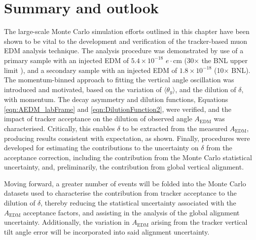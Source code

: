 \section{Summary and outlook}

The large-scale Monte Carlo simulation efforts outlined in this chapter have been shown to be vital to the development and verification of the tracker-based muon EDM analysis technique. The analysis procedure was demonstrated by use of a primary sample with an injected EDM of $5.4\times10^{-18}$ $e\cdot$cm (30$\times$ the BNL upper limit \cite{BNLEDM}), and a secondary sample with an injected EDM of $1.8\times10^{-18}$ (10$\times$ BNL). The momentum-binned approach to fitting the vertical angle oscillation was introduced and motivated, based on the variation of $\langle \theta_{y} \rangle$, and the dilution of $\delta$, with momentum. The decay asymmetry and dilution functions, Equations \ref{eqn:AEDM_labFrame} and \ref{eqn:DilutionFunction2}, were verified, and the impact of tracker acceptance on the dilution of observed angle $A_{\text{EDM}}$ was characterised. Critically, this enables $\delta$ to be extracted from the measured $A_{\text{EDM}}$, producing results consistent with expectation, as shown. Finally, procedures were developed for estimating the contributions to the uncertainty on $\delta$ from the acceptance correction, including the contribution from the Monte Carlo statistical uncertainty, and, preliminarily, the contribution from global vertical alignment. 

Moving forward, a greater number of events will be folded into the Monte Carlo datasets used to characterise the contribution from tracker acceptance to the dilution of $\delta$, thereby reducing the statistical uncertainty associated with the $A_{\text{EDM}}$ acceptance factors, and assisting in the analysis of the global alignment uncertainty. Additionally, the variation in $A_{\text{EDM}}$ arising from the tracker vertical tilt angle error will be incorporated into said alignment uncertainty.